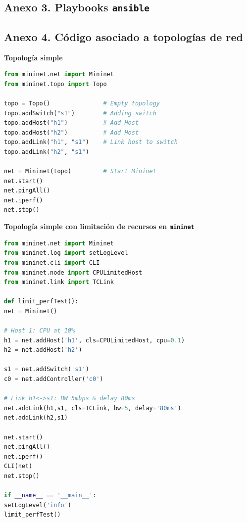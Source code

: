 \documentclass[12pt]{article}
\begin{document}
	\pagebreak
	
	\subsection*{Anexo 3. Playbooks \texttt{ansible}}
	
	\pagebreak
	
	\subsection*{Anexo 4. Código asociado a topologías de red}
	\label{sec: anexo 4}
	
	\vspace{20px}
	\noindent \textbf{\large Topología simple}\\
	
	\begin{lstlisting}[language=Python, caption={Implementación topología simple utilizando \texttt{mininet} (\texttt{basic.py})}, label={lst: topo simple}]
from mininet.net import Mininet
from mininet.topo import Topo

topo = Topo()				# Empty topology
topo.addSwitch("s1")		# Adding switch
topo.addHost("h1")			# Add Host
topo.addHost("h2")			# Add Host
topo.addLink("h1", "s1")	# Link host to switch
topo.addLink("h2", "s1")

net = Mininet(topo)			# Start Mininet
net.start()
net.pingAll()
net.iperf()
net.stop()
	\end{lstlisting}

	\vspace{20px}
	\noindent \textbf{\large Topología simple con limitación de recursos en \texttt{mininet}}\\
	\begin{lstlisting}[language=Python, caption={Código topología simple con limitación de recursos en \texttt{mininet} (\texttt{limit.py})}, label={lst: topo simple cpu mn}]
from mininet.net import Mininet
from mininet.log import setLogLevel
from mininet.cli import CLI
from mininet.node import CPULimitedHost
from mininet.link import TCLink

def limit_perfTest():
net = Mininet()

# Host 1: CPU at 10%
h1 = net.addHost('h1', cls=CPULimitedHost, cpu=0.1)		
h2 = net.addHost('h2')

s1 = net.addSwitch('s1')
c0 = net.addController('c0')

# Link h1<->s1: BW 5mbps & delay 80ms
net.addLink(h1,s1, cls=TCLink, bw=5, delay='80ms')
net.addLink(h2,s1)

net.start()
net.pingAll()
net.iperf()
CLI(net)
net.stop()

if __name__ == '__main__':
setLogLevel('info')
limit_perfTest()
	\end{lstlisting}
\end{document}
